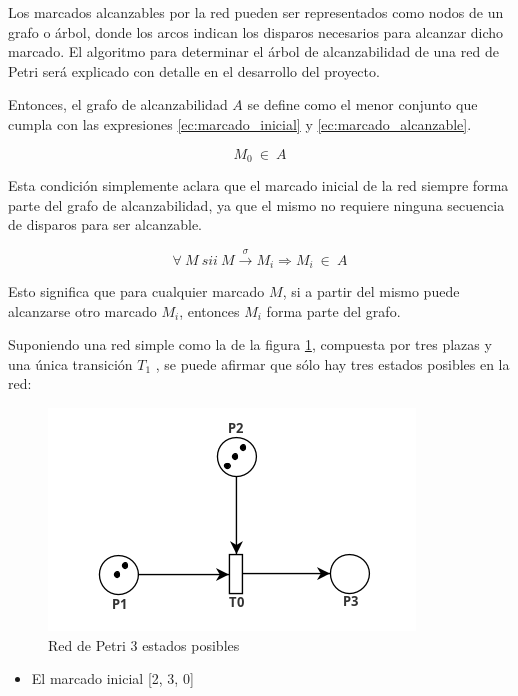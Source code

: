 Los marcados alcanzables por la red pueden ser representados como nodos de un grafo o árbol, donde los arcos indican los disparos necesarios para alcanzar dicho marcado. El algoritmo para determinar el árbol de alcanzabilidad de una red de Petri será explicado con detalle en el desarrollo del proyecto.

Entonces, el grafo de alcanzabilidad $A$ se define como el menor conjunto que cumpla con las expresiones \ref{ec:marcado_inicial} y \ref{ec:marcado_alcanzable}.

\begin{equation}
    M_0 \ \in \ A
    \label{ec:marcado_inicial}
\end{equation}

\noindent Esta condición simplemente aclara que el marcado inicial de la red siempre forma parte del grafo de alcanzabilidad, ya que el mismo no requiere ninguna secuencia de disparos para ser alcanzable.

\begin{equation}
    \forall \ M \ sii \ M \xrightarrow{\sigma} M_i \Rightarrow M_i \ \in \ A
    \label{ec:marcado_alcanzable}
\end{equation}

\noindent Esto significa que para cualquier marcado $M$, si a partir del mismo puede alcanzarse otro marcado $M_i$, entonces $M_i$ forma parte del grafo. \\ \par

\noindent Suponiendo una red simple como la de la figura \ref{fig:rdp_3_estados}, compuesta por tres plazas y una única transición $T_1$ , se puede afirmar que sólo hay tres estados posibles en la red:

\begin{figure}[H]
    \centering
    \includegraphics[width=0.5\linewidth]{images/rdp_3_estados.png}
    \caption{Red de Petri 3 estados posibles}
    \label{fig:rdp_3_estados}
\end{figure}

\begin{itemize}
    \item El marcado inicial [2, 3, 0]
\end{itemize}

